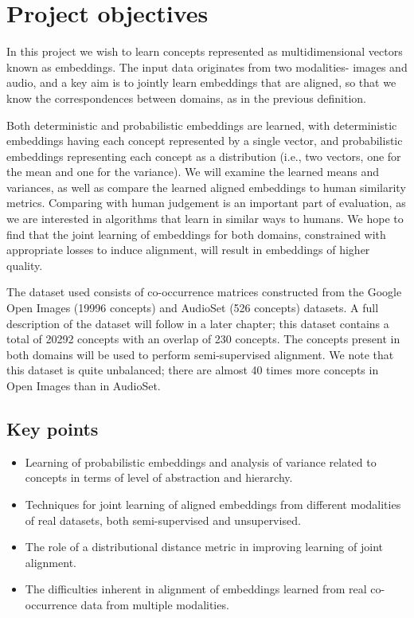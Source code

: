 \section{Project objectives}
In this project we wish to learn concepts represented as multidimensional vectors known as embeddings. The input data originates from two modalities- images and audio, and a key aim is to jointly learn embeddings that are aligned, so that we know the correspondences between domains, as in the previous definition.

Both deterministic and probabilistic embeddings are learned, with deterministic embeddings having each concept represented by a single vector, and probabilistic embeddings representing each concept as a distribution (i.e., two vectors, one for the mean and one for the variance). We will examine the learned means and variances, as well as compare the learned aligned embeddings to human similarity metrics. Comparing with human judgement is an important part of evaluation, as we are interested in algorithms that learn in similar ways to humans. We hope to find that the joint learning of embeddings for both domains, constrained with appropriate losses to induce alignment, will result in embeddings of higher quality.  

The dataset used consists of co-occurrence matrices constructed from the Google Open Images (19996 concepts) \cite{openimages} and AudioSet (526 concepts) \cite{audioset} datasets. A full description of the dataset will follow in a later chapter; this dataset contains a total of 20292 concepts with an overlap of 230 concepts. The concepts present in both domains will be used to perform semi-supervised alignment. We note that this dataset is quite unbalanced; there are almost 40 times more concepts in Open Images than in AudioSet. 

\subsection{Key points}
\begin{itemize}
    \item Learning of probabilistic embeddings and analysis of variance related to concepts in terms of level of abstraction and hierarchy.
    \item Techniques for joint learning of aligned embeddings from different modalities of real datasets, both semi-supervised and unsupervised.
    \item The role of a distributional distance metric in improving learning of joint alignment.
    \item The difficulties inherent in alignment of embeddings learned from real co-occurrence data from multiple modalities. 
\end{itemize}
